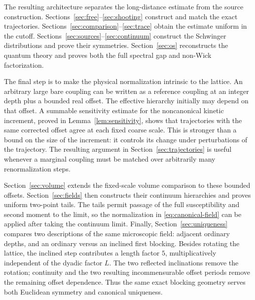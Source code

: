The resulting architecture separates the long-distance estimate from
the source construction. Sections~\ref{sec:free}--\ref{sec:shooting}
construct and match the exact trajectories.
Sections~\ref{sec:comparison}--\ref{sec:trace} obtain the estimate uniform
in the cutoff. Sections~\ref{sec:sources}--\ref{sec:continuum} construct
the Schwinger distributions and prove their symmetries.
Section~\ref{sec:os} reconstructs the quantum theory and proves both the
full spectral gap and non-Wick factorization.

The final step is to make the physical normalization intrinsic to the
lattice.  An arbitrary large bare coupling can be written as a reference
coupling at an integer depth plus a bounded real offset.  The effective
hierarchy initially may depend on that offset.  A summable sensitivity
estimate for the noncanonical kinetic increment, proved in
Lemma~\ref{lem:sensitivity}, shows that trajectories with the same
corrected offset agree at each fixed coarse scale.  This is stronger
than a bound on the size of the increment: it controls its change under
perturbations of the trajectory.  The resulting argument in
Section~\ref{sec:trajectories} is useful whenever a marginal coupling
must be matched over arbitrarily many renormalization steps.

Section~\ref{sec:volume} extends the fixed-scale volume comparison to
these bounded offsets.  Section~\ref{sec:fields} then constructs their
continuum hierarchies and proves uniform two-point tails.  The tails
permit passage of the full susceptibility and second moment to the
limit, so the normalization in \eqref{eq:canonical-field} can be applied
after taking the continuum limit.  Finally,
Section~\ref{sec:uniqueness} compares two descriptions of the same
microscopic field: adjacent ordinary depths, and an ordinary versus an
inclined first blocking.  Besides rotating the lattice, the inclined
step contributes a length factor $5$, multiplicatively independent of
the dyadic factor $L$.  The two reflected inclinations remove the
rotation; continuity and the two resulting incommensurable offset
periods remove the remaining offset dependence.  Thus the same exact
blocking geometry serves both Euclidean symmetry and canonical
uniqueness.


